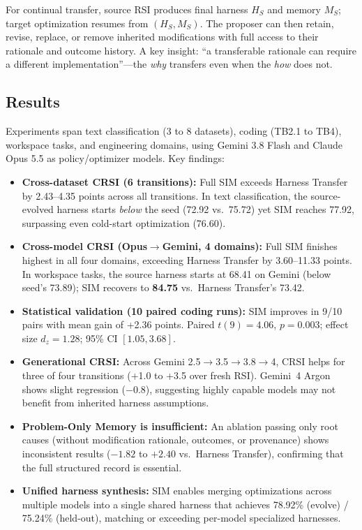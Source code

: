 \documentclass[11pt,a4paper]{article}
\begin{document}
For continual transfer, source RSI produces final harness $H_S$ and memory $M_S$; target optimization resumes from $(H_S, M_S)$. The proposer can then retain, revise, replace, or remove inherited modifications with full access to their rationale and outcome history. A key insight: ``a transferable rationale can require a different implementation''---the \emph{why} transfers even when the \emph{how} does not.

\subsection{Results}
Experiments span text classification (3 to 8 datasets), coding (TB2.1 to TB4), workspace tasks, and engineering domains, using Gemini 3.8 Flash and Claude Opus 5.5 as policy/optimizer models. Key findings:

\begin{itemize}
  \item \textbf{Cross-dataset CRSI (6 transitions):} Full SIM exceeds Harness Transfer by 2.43--4.35 points across all transitions. In text classification, the source-evolved harness starts \emph{below} the seed (72.92 vs.\ 75.72) yet SIM reaches 77.92, surpassing even cold-start optimization (76.60).
  \item \textbf{Cross-model CRSI (Opus$\to$Gemini, 4 domains):} Full SIM finishes highest in all four domains, exceeding Harness Transfer by 3.60--11.33 points. In workspace tasks, the source harness starts at 68.41 on Gemini (below seed's 73.89); SIM recovers to \textbf{84.75} vs.\ Harness Transfer's 73.42.
  \item \textbf{Statistical validation (10 paired coding runs):} SIM improves in 9/10 pairs with mean gain of +2.36 points. Paired $t(9) = 4.06$, $p = 0.003$; effect size $d_z = 1.28$; 95\% CI $[1.05, 3.68]$.
  \item \textbf{Generational CRSI:} Across Gemini 2.5$\to$3.5$\to$3.8$\to$4, CRSI helps for three of four transitions (+1.0 to +3.5 over fresh RSI). Gemini~4 Argon shows slight regression ($-0.8$), suggesting highly capable models may not benefit from inherited harness assumptions.
  \item \textbf{Problem-Only Memory is insufficient:} An ablation passing only root causes (without modification rationale, outcomes, or provenance) shows inconsistent results ($-1.82$ to $+2.40$ vs.\ Harness Transfer), confirming that the full structured record is essential.
  \item \textbf{Unified harness synthesis:} SIM enables merging optimizations across multiple models into a single shared harness that achieves 78.92\% (evolve) / 75.24\% (held-out), matching or exceeding per-model specialized harnesses.
\end{itemize}
\end{document}
